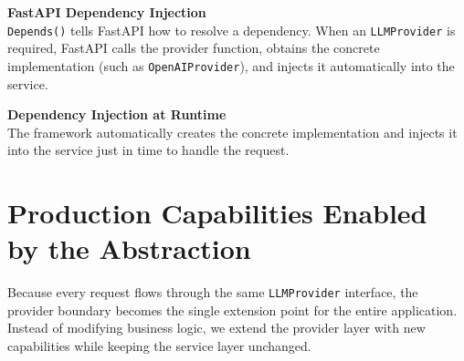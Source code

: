\documentclass[11pt]{article}
\begin{document}
\hfill
\begin{minipage}[c]{0.48\textwidth}
    \textbf{\color{brandblue}FastAPI Dependency Injection}\\[0.1in]
    \small
    \texttt{Depends()} tells FastAPI how to resolve a dependency. When an \texttt{LLMProvider} is required, FastAPI calls the provider function, obtains the concrete implementation (such as \texttt{OpenAIProvider}), and injects it automatically into the service.
    
    \vspace{0.25in}
    
    \begin{tcolorbox}[
        colback=brandlight,
        colframe=brandblue,
        arc=5pt,
        boxrule=0.8pt,
        left=10pt, right=10pt, top=10pt, bottom=10pt
    ]
    \small
    \textbf{\color{brandblue}Dependency Injection at Runtime}\\[0.1in]
    The framework automatically creates the concrete implementation and injects it into the service just in time to handle the request.
    \end{tcolorbox}
\end{minipage}

\newpage


\section*{Production Capabilities Enabled by the Abstraction}
\vspace{0.15in}

Because every request flows through the same \texttt{LLMProvider} interface, the provider boundary becomes the single extension point for the entire application. Instead of modifying business logic, we extend the provider layer with new capabilities while keeping the service layer unchanged.

\vspace{0.15in}
\end{document}
